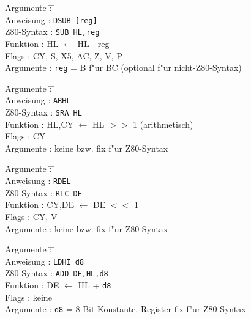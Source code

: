 \documentclass[12pt,a4paper,twoside]{report}
\newcommand{\tty}[1]{{\tt #1}}
\begin{document}
\begin{tabbing}
Argumente         \= : \= \kill \\
Anweisung         \> : \> \tty{DSUB [reg]} \\
Z80-Syntax        \> : \> \tty{SUB HL,reg} \\
Funktion          \> : \> HL $\leftarrow$ HL - reg \\
Flags             \> : \> CY, S, X5, AC, Z, V, P \\
Argumente         \> : \> \tty{reg} = B f"ur BC (optional f"ur nicht-Z80-Syntax) \\
\end{tabbing}

\begin{tabbing}
Argumente         \= : \= \kill \\
Anweisung         \> : \> \tty{ARHL} \\
Z80-Syntax        \> : \> \tty{SRA HL} \\
Funktion          \> : \> HL,CY $\leftarrow$ HL $>>$ 1 (arithmetisch) \\
Flags             \> : \> CY \\
Argumente         \> : \> keine bzw. fix f"ur Z80-Syntax \\
\end{tabbing}

\begin{tabbing}
Argumente         \= : \= \kill \\
Anweisung         \> : \> \tty{RDEL} \\
Z80-Syntax        \> : \> \tty{RLC DE} \\
Funktion          \> : \> CY,DE $\leftarrow$ DE $<<$ 1 \\
Flags             \> : \> CY, V \\
Argumente         \> : \> keine bzw. fix f"ur Z80-Syntax \\
\end{tabbing}

\begin{tabbing}
Argumente         \= : \= \kill \\
Anweisung         \> : \> \tty{LDHI d8} \\
Z80-Syntax        \> : \> \tty{ADD DE,HL,d8} \\
Funktion          \> : \> DE $\leftarrow$ HL + {\tt d8} \\
Flags             \> : \> keine \\
Argumente         \> : \> {\tt d8} = 8-Bit-Konstante, Register fix f"ur Z80-Syntax \\
\end{tabbing}
\end{document}
